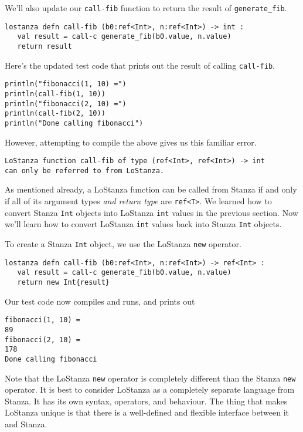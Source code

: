 \documentclass[10pt,oneside]{book}
\begin{document}
We'll also update our \texttt{\frenchspacing call-fib} function to return the result of \texttt{\frenchspacing generate\_fib}.
\begin{lstlisting}
lostanza defn call-fib (b0:ref<Int>, n:ref<Int>) -> int :
   val result = call-c generate_fib(b0.value, n.value)
   return result
\end{lstlisting}

Here's the updated test code that prints out the result of calling \texttt{\frenchspacing call-fib}.
\begin{lstlisting}
println("fibonacci(1, 10) =")
println(call-fib(1, 10))
println("fibonacci(2, 10) =")
println(call-fib(2, 10))
println("Done calling fibonacci")
\end{lstlisting}

However, attempting to compile the above gives us this familiar error.
\begin{lstlisting}
LoStanza function call-fib of type (ref<Int>, ref<Int>) -> int 
can only be referred to from LoStanza.
\end{lstlisting}

As mentioned already, a LoStanza function can be called from Stanza if and only if all of its argument types {\em and return type} are \texttt{\frenchspacing ref<T>}. We learned how to convert Stanza \texttt{\frenchspacing Int} objects into LoStanza \texttt{\frenchspacing int} values in the previous section. Now we'll learn how to convert LoStanza \texttt{\frenchspacing int} values back into Stanza \texttt{\frenchspacing Int} objects.

To create a Stanza \texttt{\frenchspacing Int} object, we use the LoStanza \texttt{\frenchspacing new} operator.
\begin{lstlisting}
lostanza defn call-fib (b0:ref<Int>, n:ref<Int>) -> ref<Int> :
   val result = call-c generate_fib(b0.value, n.value)
   return new Int{result}
\end{lstlisting}

Our test code now compiles and runs, and prints out
\begin{lstlisting}
fibonacci(1, 10) =
89
fibonacci(2, 10) =
178
Done calling fibonacci
\end{lstlisting}

Note that the LoStanza \texttt{\frenchspacing new} operator is completely different than the Stanza \texttt{\frenchspacing new} operator. It is best to consider LoStanza as a completely separate language from Stanza. It has its own syntax, operators, and behaviour. The thing that makes LoStanza unique is that there is a well-defined and flexible interface between it and Stanza.
\end{document}
